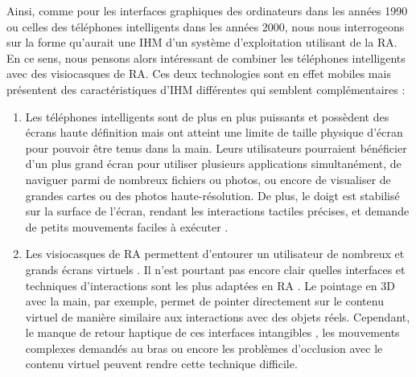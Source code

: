 Ainsi, comme pour les interfaces graphiques des ordinateurs dans les années 1990 ou celles des téléphones intelligents dans les années 2000, nous nous interrogeons sur la forme qu'aurait une IHM d'un système d'exploitation utilisant de la RA. En ce sens, nous pensons alors intéressant de combiner les téléphones intelligents avec des visiocasques de RA. Ces deux technologies sont en effet mobiles mais présentent des caractéristiques d'IHM différentes qui semblent complémentaires :
\begin{enumerate}
  \item Les téléphones intelligents sont de plus en plus puissants et possèdent des écrans haute définition mais ont atteint une limite de taille physique d'écran pour pouvoir être tenus dans la main. Leurs utilisateurs pourraient bénéficier d'un plus grand écran pour utiliser plusieurs applications simultanément, de naviguer parmi de nombreux fichiers ou photos, ou encore de visualiser de grandes cartes ou des photos haute-résolution. De plus, le doigt est stabilisé sur la surface de l'écran, rendant les interactions tactiles précises, et demande de petits mouvements faciles à exécuter \citep{Argelaguet2013}.
  \item Les visiocasques de RA permettent d'entourer un utilisateur de nombreux et grands écrans virtuels \citep{Ens2014}. Il n'est pourtant pas encore clair quelles interfaces et techniques d'interactions sont les plus adaptées en RA \citep{Piumsomboon2013, Billinghurst2015}. Le pointage en 3D avec la main, par exemple, permet de pointer directement sur le contenu virtuel de manière similaire aux interactions avec des objets réels. Cependant, le manque de retour haptique de ces interfaces intangibles \citep{Chan2010}, les mouvements complexes demandés au bras \citep{Argelaguet2013} ou encore les problèmes d'occlusion avec le contenu virtuel \citep{Piumsomboon2014} peuvent rendre cette technique difficile.
\end{enumerate}
\medskip


